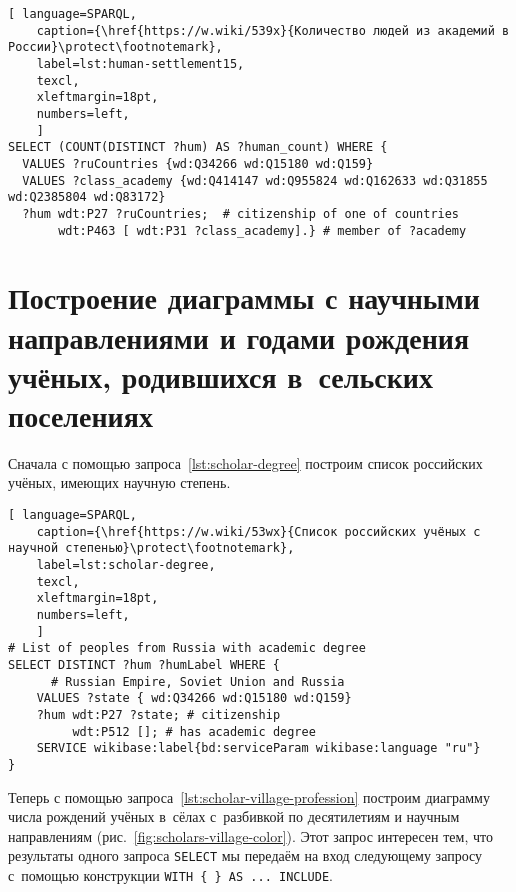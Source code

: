 \begin{lstlisting}[ language=SPARQL, 
    caption={\href{https://w.wiki/539x}{Количество людей из академий в России}\protect\footnotemark},
    label=lst:human-settlement15,
    texcl,
    xleftmargin=18pt, 
    numbers=left,
    ]
SELECT (COUNT(DISTINCT ?hum) AS ?human_count) WHERE {
  VALUES ?ruCountries {wd:Q34266 wd:Q15180 wd:Q159}
  VALUES ?class_academy {wd:Q414147 wd:Q955824 wd:Q162633 wd:Q31855 wd:Q2385804 wd:Q83172}
  ?hum wdt:P27 ?ruCountries;  # citizenship of one of countries
       wdt:P463 [ wdt:P31 ?class_academy].} # member of ?academy
\end{lstlisting}%





\section{Построение диаграммы с научными направлениями 
и годами рождения учёных, \mbox{родившихся} в~сельских поселениях}

Сначала с помощью запроса~\ref{lst:scholar-degree} 
построим список российских учёных, имеющих научную степень.

\begin{lstlisting}[ language=SPARQL, 
    caption={\href{https://w.wiki/53wx}{Список российских учёных с научной степенью}\protect\footnotemark},
    label=lst:scholar-degree,
    texcl,
    xleftmargin=18pt, 
    numbers=left,
    ]
# List of peoples from Russia with academic degree
SELECT DISTINCT ?hum ?humLabel WHERE {
      # Russian Empire, Soviet Union and Russia
    VALUES ?state { wd:Q34266 wd:Q15180 wd:Q159}
    ?hum wdt:P27 ?state; # citizenship
         wdt:P512 []; # has academic degree 
    SERVICE wikibase:label{bd:serviceParam wikibase:language "ru"}
}
\end{lstlisting}%



Теперь с помощью запроса~\ref{lst:scholar-village-profession} 
построим диаграмму числа рождений учёных в~сёлах с~разбивкой по десятилетиям %
и научным направлениям (рис.~\ref{fig:scholars-village-color}). 
Этот запрос интересен тем, что результаты одного запроса \lstinline|SELECT| 
мы передаём на вход следующему запросу с~помощью конструкции \lstinline|WITH { } AS ... INCLUDE|. 

